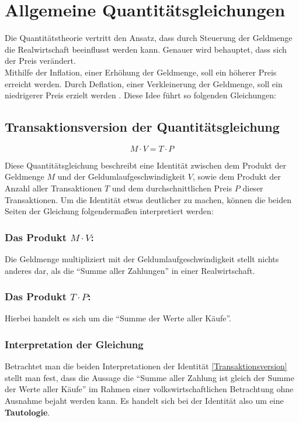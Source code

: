 \section{Allgemeine Quantitätsgleichungen}

Die Quantitätstheorie vertritt den Ansatz, dass durch Steuerung der Geldmenge die Realwirtschaft beeinflusst werden kann. Genauer wird behauptet, dass sich der Preis verändert. \\
Mithilfe der Inflation, einer Erhöhung der Geldmenge, soll ein höherer Preis erreicht werden. Durch Deflation, einer Verkleinerung der Geldmenge, soll ein niedrigerer Preis erzielt werden \autocite[110]{clement1998grundlagen}. Diese Idee führt so folgenden Gleichungen:
\subsection{Transaktionsversion der Quantitätsgleichung}
\begin{equation}
    \tag{Transaktionsversion}
    M \cdot V = T \cdot P
\end{equation}\label{Transaktionsversion}

Diese Quantitätsgleichung beschreibt eine Identität zwischen dem Produkt der Geldmenge $M$ und der Geldumlaufgeschwindigkeit $V$, sowie dem Produkt der Anzahl aller Transaktionen $T$ und dem durchschnittlichen Preis $P$ dieser Transaktionen. Um die Identität etwas deutlicher zu machen, können die beiden Seiten der Gleichung folgendermaßen interpretiert werden:

\subsubsection*{Das Produkt $M \cdot V$:}
Die Geldmenge multipliziert mit der Geldumlaufgeschwindigkeit stellt nichts anderes dar, als die \enquote{Summe aller Zahlungen} in einer Realwirtschaft.

\subsubsection*{Das Produkt $T \cdot P$:}
Hierbei handelt es sich um die \enquote{Summe der Werte aller Käufe}.

\subsubsection*{Interpretation der Gleichung}
Betrachtet man die beiden Interpretationen der Identität \vref{Transaktionsversion} stellt man fest, dass die Aussage die \enquote{Summe aller Zahlung ist gleich der Summe der Werte aller Käufe} im Rahmen einer volkswirtschaftlichen Betrachtung ohne Ausnahme bejaht werden kann. Es handelt sich bei der Identität also um eine \textbf{Tautologie}.

